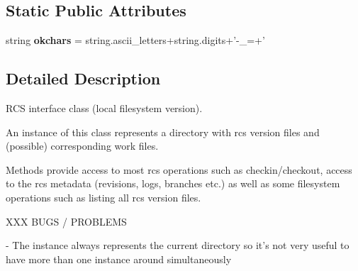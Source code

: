 \subsection*{Static Public Attributes}
\begin{DoxyCompactItemize}
\item 
\hypertarget{classsrc_1_1rcslib_1_1_r_c_s_ae1c303bd984c0c32e2bc6217ac1c21d8}{string {\bfseries okchars} = string.\-ascii\-\_\-letters+string.\-digits+'-\/\-\_\-=+'}\label{classsrc_1_1rcslib_1_1_r_c_s_ae1c303bd984c0c32e2bc6217ac1c21d8}

\end{DoxyCompactItemize}


\subsection{Detailed Description}
\begin{DoxyVerb}RCS interface class (local filesystem version).

An instance of this class represents a directory with rcs version
files and (possible) corresponding work files.

Methods provide access to most rcs operations such as
checkin/checkout, access to the rcs metadata (revisions, logs,
branches etc.) as well as some filesystem operations such as
listing all rcs version files.

XXX BUGS / PROBLEMS

- The instance always represents the current directory so it's not
very useful to have more than one instance around simultaneously\end{DoxyVerb}
 

